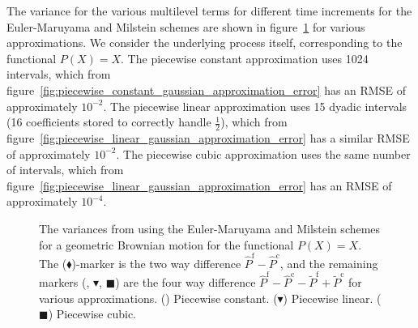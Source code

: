 \documentclass[manuscript,review]{acmart}
\begin{document}
The variance for the various multilevel terms for different time increments for the Euler-Maruyama and Milstein schemes are shown in figure~\ref{fig:variance_reduction} for various approximations. We consider the underlying process itself, corresponding to the functional $ P(X) = X $. The piecewise constant approximation uses 1024 intervals, which from figure~\ref{fig:piecewise_constant_gaussian_approximation_error} has an RMSE of approximately $ 10^{-2} $. The piecewise linear approximation uses 15 dyadic intervals (16 coefficients stored to correctly handle $ \tfrac{1}{2} $), which from figure~\ref{fig:piecewise_linear_gaussian_approximation_error} has a similar RMSE of approximately $ 10^{-2} $. The piecewise cubic approximation uses the same number of intervals, which from figure~\ref{fig:piecewise_linear_gaussian_approximation_error} has an RMSE of approximately $ 10^{-4} $.

\begin{figure}[htb]
\centering

\hfill
{}\hfill 
{}\hfill

\caption{The variances from using the Euler-Maruyama and Milstein schemes for a geometric Brownian motion for the functional $ P(X) = X $. The ($ \blacklozenge $)-marker is the two way difference $ \hat{P}^{\mathrm{f}} - \hat{P}^{\mathrm{c}} $, and the remaining markers (\raisebox{-0.1em}{\huge$ \bullet$}, {\large $ \blacktriangledown $}, $ \blacksquare $) are the four way difference $ \hat{P}^{\mathrm{f}} - \hat{P}^{\mathrm{c}} - \tilde{P}^{\mathrm{f}} + \tilde{P}^{\mathrm{c}} $ for various approximations. (\raisebox{-0.1em}{\huge$ \bullet$}) Piecewise constant. ({\large $ \blacktriangledown $}) Piecewise linear. ($ \blacksquare $) Piecewise cubic.}
\label{fig:variance_reduction}

\end{figure}
\end{document}
